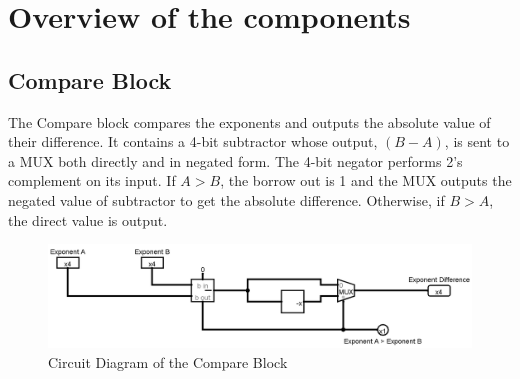 \documentclass[12pt, a4paper]{article}
\begin{document}
	\section{Overview of the components}
	\subsection{Compare Block}
	The Compare block compares the exponents and outputs the absolute value of
	their difference. It contains a 4-bit subtractor whose output, $(B-A)$, is
	sent to a MUX both directly and in negated form. The 4-bit negator performs
	2's complement on its input. If $ A > B$, the borrow out is 1 and the MUX
	outputs the negated value of subtractor to get the absolute difference.
	Otherwise, if $B > A$, the direct value is output.
	\begin{figure}[h!]
		\centering
		\includegraphics[width = \linewidth]{compare}
		\caption{Circuit Diagram of the Compare Block}
		\label{fig4}
	\end{figure}
\end{document}
